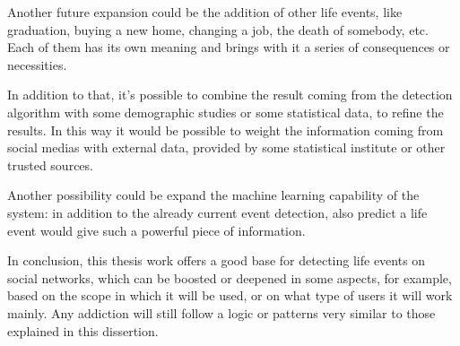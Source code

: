 Another future expansion could be the addition of other life events, like graduation, buying a new home, changing a job, the death of somebody, etc. Each of them has its own meaning and brings with it a series of consequences or necessities.

In addition to that, it's possible to combine the result coming from the detection algorithm with some demographic studies or some statistical data, to refine the results. In this way it would be possible to weight the information coming from social medias with external data, provided by some statistical institute or other trusted sources.

Another possibility could be expand the machine learning capability of the system: in addition to the already current event detection, also predict a life event would give such a powerful piece of information.

In conclusion, this thesis work offers a good base for detecting life events on social networks, which can be boosted or deepened in some aspects, for example, based on the scope in which it will be used, or on what type of users it will work mainly. Any addiction will still follow a logic or patterns very similar to those explained in this dissertion.